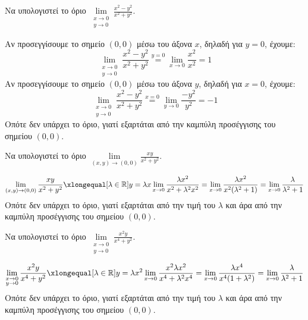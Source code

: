 \documentclass[a4paper,11pt]{report}
\begin{document}
\begin{example}
  Να υπολογιστεί το όριο $ \lim\limits_{\substack{x\to 0 \\y \to 0}} 
  \frac{x^{2}-y^{2}}{x^{2}+y^{2}} $.
  \begin{solution}
    Αν προσεγγίσουμε το σημείο $ (0,0) $ μέσω του άξονα $x$, δηλαδή για $ y=0 $, έχουμε:
    \[
      \lim\limits_{\substack{x\to 0 \\y \to 0}} \frac{x^{2}-y^{2}}{x^{2}+y^{2}} 
      \overset{y=0}{=} \lim_{x \to 0} \frac{x^{2}}{x^{2}} = 1
    \] 
    Αν προσεγγίσουμε το σημείο $ (0,0) $ μέσω του άξονα $y$, δηλαδή για $ x=0 $, έχουμε:
    \[
      \lim\limits_{\substack{x\to 0 \\y \to 0}} \frac{x^{2}-y^{2}}{x^{2}+y^{2}} 
      \overset{x=0}{=} \lim_{y \to 0} \frac{-y^{2}}{y^{2}} = -1
    \]
    Οπότε δεν υπάρχει το όριο, γιατί εξαρτάται από την καμπύλη προσέγγισης του σημείου 
    $ (0,0) $.
  \end{solution}
\end{example}

\begin{example}
  Να υπολογιστεί το όριο $ \lim\limits_{(x,y)\to (0, 0)} \frac{xy}{x^{2}+y^{2}} $.
  \begin{solution}
    \[
      \lim\limits_{(x,y)\to (0, 0)} \frac{xy}{x^{2}+y^{2}} 
      \xlongequal[\lambda \in \mathbb{R}]{y= \lambda x} \lim_{x \to 0}
      \frac{\lambda x^{2}}{x^{2}+ \lambda^{2} x^{2}} = \lim_{x \to 0} 
      \frac{\lambda x^{2}}{x^{2}(\lambda ^{2}+1)} = \lim_{x \to 0} 
      \frac{\lambda}{\lambda ^{2}+1} 
    \]
    Οπότε δεν υπάρχει το όριο, γιατί εξαρτάται από την τιμή του 
    $ \lambda $ και άρα από την καμπύλη προσέγγισης του σημείου 
    $ (0,0) $.
  \end{solution}
\end{example}

\begin{example}
  Να υπολογιστεί το όριο $ \lim\limits_{\substack{x\to 0 \\y \to 0}} 
  \frac{x^{2}y}{x^{4}+y^{2}} $.
  \begin{solution}
    \[
      \lim\limits_{\substack{x\to 0 \\y \to 0}} 
      \frac{x^{2}y}{x^{4}+y^{2}} 
      \xlongequal[\lambda \in \mathbb{R}]{y= \lambda x^{2}} 
      \lim_{x \to 0} \frac{x^{2} \lambda x^{2}}
      {x^{4}+\lambda^{2}x^{4}} = \lim_{x\to 0} 
      \frac{\lambda x^{4}}{x^{4}(1+\lambda ^{2})} = 
      \lim_{x \to 0} \frac{\lambda}{\lambda ^{2}+1} 
    \] 
    Οπότε δεν υπάρχει το όριο, γιατί εξαρτάται από την τιμή του $ \lambda $ 
    και άρα από την καμπύλη προσέγγισης του σημείου $ (0,0) $.
  \end{solution}
\end{example}
\end{document}
